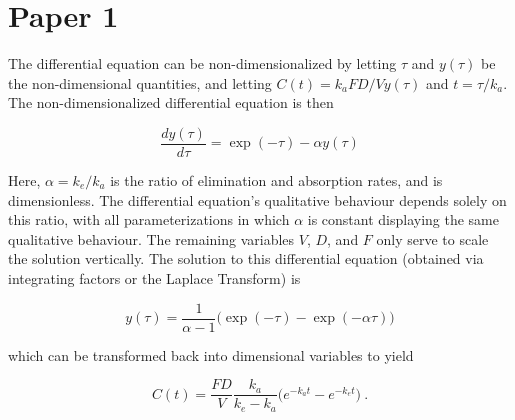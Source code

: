 \chapter{Paper 1}

The differential equation can be non-dimensionalized by letting $\tau$ and $y(\tau)$ be the non-dimensional quantities, and letting $C(t) = k_a FD/V y(\tau)$ and $t = \tau/k_a$.  The non-dimensionalized differential equation is then

\begin{equation}
	\dfrac{dy(\tau)}{d\tau} = \exp(-\tau) - \alpha y(\tau)
\end{equation}

\noindent Here, $\alpha = k_e / k_a$ is the ratio of elimination and absorption rates, and is dimensionless.  The differential equation's qualitative behaviour depends solely on this ratio, with all parameterizations in which $\alpha$ is constant displaying the same qualitative behaviour.  The remaining variables $V$, $D$, and $F$ only serve to scale the solution vertically.  The solution to this differential equation (obtained via integrating factors or the Laplace Transform) is

\begin{equation}\label{key}
	y(\tau) = \dfrac{1}{\alpha -1} \Big( \exp(-\tau) - \exp(-\alpha \tau) \Big)
\end{equation}

\noindent which can be transformed back into dimensional variables to yield 

\begin{equation}\label{onecompartment_PKPD}
	C(t) = \dfrac{F D}{V}\dfrac{k_a}{k_e - k_a}\Big(e^{-k_at} - e^{-k_et}\Big) \>.
\end{equation}

